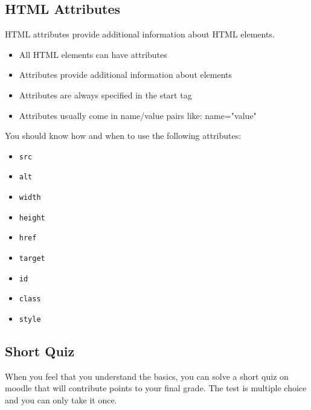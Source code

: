 \documentclass[english,11pt,a4paper]{report}
\begin{document}
\subsection{HTML Attributes}
HTML attributes provide additional information about HTML elements.

\begin{itemize}
	\item All HTML elements can have attributes
    \item Attributes provide additional information about elements
    \item Attributes are always specified in the start tag
    \item Attributes usually come in name/value pairs like: name="value"
\end{itemize}

You should know how and when to use the following attributes:
\begin{itemize}
    \item \verb|src|
    \item \verb|alt|
    \item \verb|width|
    \item \verb|height|
    \item \verb|href|
    \item \verb|target|
    \item \verb|id|
    \item \verb|class|
    \item \verb|style|
\end{itemize}



\subsection{Short Quiz}
When you feel that you understand the basics, you can solve a short quiz on moodle that will contribute points to your final grade. The test is multiple choice and you can only take it once. 
\end{document}
